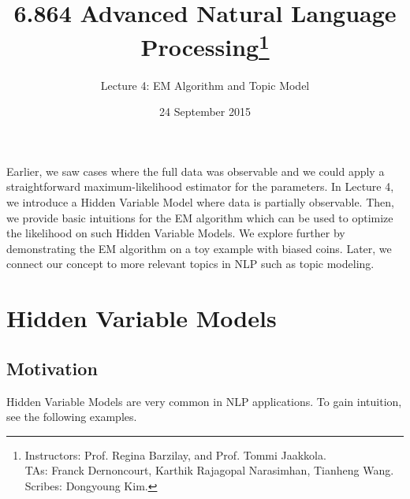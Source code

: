 \documentclass[justified, marginals=justified]{tufte-handout}
\title{6.864 Advanced Natural Language Processing\thanks{Instructors: Prof. Regina Barzilay, and Prof. Tommi Jaakkola.\\ TAs: Franck Dernoncourt, Karthik Rajagopal Narasimhan, Tianheng Wang. \\ Scribes: Dongyoung Kim.}}
\author[Lecture 4: EM Algorithm and Topic Model]{Lecture 4: EM Algorithm and Topic Model}
\date{24 September 2015} %
\theoremstyle{definition}
\begin{document}
\maketitle%

Earlier, we saw cases where the full data was observable and we could apply a straightforward maximum-likelihood estimator for the parameters. In Lecture 4, we introduce a Hidden Variable Model where data is partially observable. Then, we provide basic intuitions for the EM algorithm which can be used to optimize the likelihood on such Hidden Variable Models. We explore further by demonstrating the EM algorithm on a toy example with biased coins. Later, we connect our concept to more relevant topics in NLP such as topic modeling.  

\section{Hidden Variable Models}\label{sec:hidden-variable-models}

\subsection{Motivation}\label{sec:motivation}

Hidden Variable Models are very common in NLP applications. To gain intuition, see the following examples. 
\end{document}
